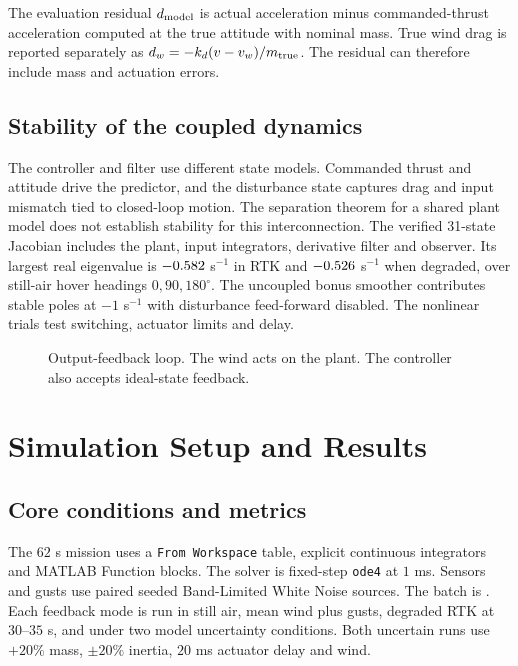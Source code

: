 \documentclass[conference]{IEEEtran}
\begin{document}
The evaluation residual \(d_{\rm model}\) is actual acceleration
minus commanded-thrust acceleration computed at the true attitude
with nominal mass. True wind drag is reported separately as
\(d_w=-k_d(v-v_w)/m_{\rm true}\).
The residual can therefore include mass and actuation errors.

\subsection{Stability of the coupled dynamics}
The controller and filter use different state models.
Commanded thrust and attitude drive the predictor, and the
disturbance state captures drag and input mismatch tied to
closed-loop motion. The separation theorem for a shared
plant model does not establish stability for this interconnection.
The verified 31-state Jacobian includes the plant, input
integrators, derivative filter and observer.
Its largest real eigenvalue is \(-0.582\) s\(^{-1}\)
in RTK and \(-0.526\) s\(^{-1}\) when degraded, over
still-air hover headings \(0,90,180^\circ\).
The uncoupled bonus smoother contributes stable poles at
\(-1\) s\(^{-1}\) with disturbance feed-forward disabled.
The nonlinear trials test switching, actuator limits and delay.

\begin{figure}[!ht]
\centering
{}
\caption{Output-feedback loop. The wind acts on the plant.
The controller also accepts ideal-state feedback.}
\end{figure}

\clearpage
\section{Simulation Setup and Results}
\subsection{Core conditions and metrics}
The \(62\) s mission uses a \texttt{From Workspace} table,
explicit continuous integrators and MATLAB Function blocks.
The solver is fixed-step \texttt{ode4} at \(1\) ms.
Sensors and gusts use paired seeded Band-Limited White Noise
sources. The batch is \texttt{\batchId}.
Each feedback mode is run in still air, mean wind plus gusts,
degraded RTK at \(30\)--\(35\) s, and under two model uncertainty
conditions. Both uncertain runs use \(+20\%\) mass,
\(\pm20\%\) inertia, \(20\) ms actuator delay and wind.
\end{document}
